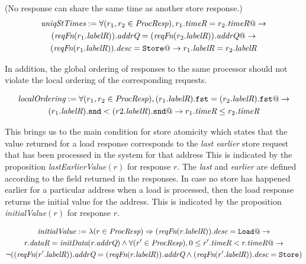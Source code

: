 \begin{defn} (No response can share the same time as another store response.)
\small
\begin{multline*}
\textit{uniqStTimes} := 
\forall (r_1, r_2 \in \textit{ProcResp}),
r_1.\textit{timeR} = r_2.\textit{timeR} @-> \\
(\textit{reqFn} (r_1.\textit{labelR})).\textit{addrQ} = (\textit{reqFn} (r_2.\textit{labelR})).\textit{addrQ} @->\\
(\textit{reqFn} (r_1.\textit{labelR})).\textit{desc} = \texttt{Store} @->
r_1.\textit{labelR} = r_2.\textit{labelR}
\end{multline*}
\end{defn}

In addition, the global ordering of responses to the same processor should not
violate the local ordering of the corresponding requests.

\begin{defn}
\small
\begin{multline*}
\textit{localOrdering} :=
\forall (r_1, r_2 \in \textit{ProcResp}), (r_1.\textit{labelR}).\texttt{fst} = (r_2.\textit{labelR}).\texttt{fst} @->\\
(r_1.\textit{labelR}).\texttt{snd} < (r2.\textit{labelR}).\texttt{snd} @-> r_1.\textit{timeR} \le r_2.\textit{timeR}
\end{multline*}
\end{defn}

This brings us to the main condition for store atomicity which states that the
value returned for a load response corresponds to the \emph{last earlier} store
request that has been processed in the system for that address This is
indicated by the proposition \textit{lastEarlierValue}$(r)$ for response $r$.
The \emph{last} and \emph{earlier} are defined according to the field \timeR{}
returned in the responses. In case no store has happened earlier for a
particular address when a load is processed, then the load response returns the
initial value for the address. This is indicated by the proposition
\textit{initialValue}$(r)$ for response $r$.
\begin{defn}
\small
\begin{multline*}
\textit{initialValue} := \lambda (r \in \textit{ProcResp}) \Rightarrow
(\textit{reqFn} (r.\textit{labelR})).\textit{desc} = \texttt{Load} @->\\ r.\textit{dataR} = \textit{initData} (r.\textit{addrQ}) \wedge 
\forall (r' \in \textit{ProcResp}), 0 \le r'.\textit{timeR} < r.\textit{timeR} @->\\
\neg ((\textit{reqFn} (r'.\textit{labelR})).\textit{addrQ} = (\textit{reqFn} (r.\textit{labelR})).\textit{addrQ} \wedge (\textit{reqFn} (r'.\textit{labelR})).\textit{desc} = \texttt{Store})
\end{multline*}
\end{defn}

